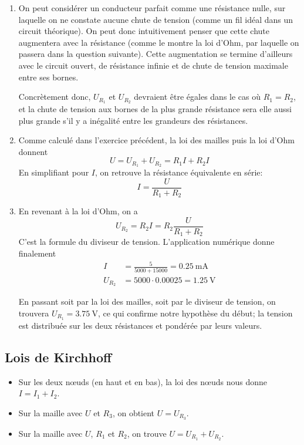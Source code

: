 \documentclass{article}
\begin{document}
\begin{enumerate}
    \item On peut considérer un conducteur parfait comme une résistance nulle, sur laquelle on ne constate aucune chute de tension (comme un fil idéal dans un circuit théorique). On peut donc intuitivement penser que cette chute augmentera avec la résistance (comme le montre la loi d'Ohm, par laquelle on passera dans la question suivante). Cette augmentation se termine d'ailleurs avec le circuit ouvert, de résistance infinie et de chute de tension maximale entre ses bornes.
    
    Concrètement donc, $U_{R_1}$ et $U_{R_2}$ devraient être égales dans le cas où $R_1=R_2$, et la chute de tension aux bornes de la plus grande résistance sera elle aussi plus grande s'il y a inégalité entre les grandeurs des résistances.
    \item Comme calculé dans l'exercice précédent, la loi des mailles puis la loi d'Ohm donnent \[U=U_{R_1}+U_{R_2}=R_1I+R_2I\]
    En simplifiant pour $I$, on retrouve la résistance équivalente en série:\[I=\frac{U}{R_1+R_2}\]
    \item En revenant à la loi d'Ohm, on a \[U_{R_2}=R_2I=R_2\frac{U}{R_1+R_2}\] C'est la formule du diviseur de tension. L'application numérique donne finalement
    \begin{align*}
        I&=\frac{5}{5000+15000}=\SI{0.25}{\milli\ampere}\\
        U_{R_2}&=5000\cdot0.00025=\SI{1.25}{\volt}
    \end{align*}
    
    En passant soit par la loi des mailles, soit par le diviseur de tension, on trouvera $U_{R_1}=\SI{3.75}{\volt}$, ce qui confirme notre hypothèse du début; la tension est distribuée sur les deux résistances et pondérée par leurs valeurs.
\end{enumerate}

\subsection{Lois de Kirchhoff}
\begin{itemize}
    \item Sur les deux n\oe{}uds (en haut et en bas), la loi des n\oe{}uds nous donne $I=I_1+I_2$.
    \item Sur la maille avec $U$ et $R_3$, on obtient $U=U_{R_3}$.
    \item Sur la maille avec $U$, $R_1$ et $R_2$, on trouve $U=U_{R_1}+U_{R_2}$.
\end{itemize}
\end{document}
